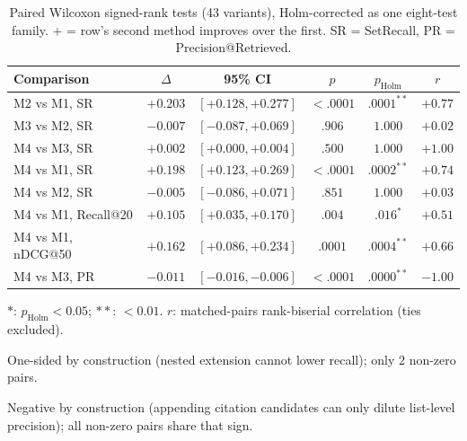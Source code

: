 \documentclass[nonacm,sigconf]{acmart}
\begin{document}
\begin{table}[t]
\centering
\small
\setlength{\tabcolsep}{2.6pt}
\begin{threeparttable}
\caption{Paired Wilcoxon signed-rank tests (43 variants), Holm-corrected
as one eight-test family. $+$ = row's second method improves over the
first. SR = SetRecall, PR = Precision@Retrieved.}
\label{tab:significance}
\footnotesize
\begin{tabular}{@{}lccccc@{}}
\toprule
Comparison & $\Delta$ & 95\% CI & $p$ & $p_{\text{Holm}}$ & $r$ \\
\midrule
M2 vs M1, SR & $+0.203$ & $[+0.128, +0.277]$ & $<.0001$ & $.0001^{**}$ & $+0.77$ \\
M3 vs M2, SR & $-0.007$ & $[-0.087, +0.069]$ & $.906$ & $1.000$ & $+0.02$ \\
M4 vs M3, SR\tnote{a} & $+0.002$ & $[+0.000, +0.004]$ & $.500$ & $1.000$ & $+1.00$ \\
M4 vs M1, SR & $+0.198$ & $[+0.123, +0.269]$ & $<.0001$ & $.0002^{**}$ & $+0.74$ \\
M4 vs M2, SR & $-0.005$ & $[-0.086, +0.071]$ & $.851$ & $1.000$ & $+0.03$ \\
M4 vs M1, Recall@20 & $+0.105$ & $[+0.035, +0.170]$ & $.004$ & $.016^{*}$ & $+0.51$ \\
M4 vs M1, nDCG@50 & $+0.162$ & $[+0.086, +0.234]$ & $.0001$ & $.0004^{**}$ & $+0.66$ \\
M4 vs M3, PR\tnote{b} & $-0.011$ & $[-0.016, -0.006]$ & $<.0001$ & $.0000^{**}$ & $-1.00$ \\
\bottomrule
\end{tabular}
\begin{tablenotes}
\item $*$: $p_{\text{Holm}}<0.05$; $**$: $<0.01$. $r$: matched-pairs
rank-biserial correlation (ties excluded).
\item[a] One-sided by construction (nested extension cannot lower
recall); only 2 non-zero pairs.
\item[b] Negative by construction (appending citation candidates can only
dilute list-level precision); all non-zero pairs share that sign.
\end{tablenotes}
\end{threeparttable}
\end{table}
\end{document}
